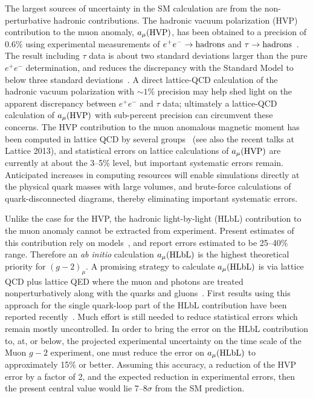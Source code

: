 \begin{itemize}
The largest sources of uncertainty in the SM calculation are from the non-perturbative hadronic contributions.
The hadronic vacuum polarization (HVP) contribution to the muon anomaly, $a_{\mu}(\rm HVP)$, has been obtained to a precision of 0.6\% using experimental measurements of $e^{+}e^{-}\to\rm hadrons$ and $\tau\to\rm hadrons$~\cite{Davier:2010nc,Hagiwara:2011af}.
The result including $\tau$ data is about two standard deviations larger than the pure $e^+e^-$
determination, and reduces the discrepancy with the Standard Model to below three standard
deviations~\cite{Davier:2010nc}.
A direct lattice-QCD calculation of the hadronic vacuum polarization with $\sim 1\%$ precision may help shed
light on the apparent discrepancy between $e^{+}e^{-}$ and $\tau$ data;
ultimately a lattice-QCD calculation of $a_{\mu}(\rm HVP)$ with sub-percent precision can circumvent these
concerns.  The HVP contribution to the muon anomalous magnetic moment has been computed in lattice QCD by several groups~\cite{Blum:2002ii,Gockeler:2003cw,Aubin:2006xv,Feng:2011zk,Boyle:2011hu,DellaMorte:2011aa} (see also the recent talks at Lattice 2013), and statistical errors on lattice calculations of $a_{\mu}(\rm HVP)$ are currently
at about the 3--5\% level, but important systematic errors remain. Anticipated increases in computing resources will enable simulations directly at the physical quark masses with large volumes, and brute-force calculations of quark-disconnected diagrams, thereby eliminating important systematic errors.

Unlike the case for the HVP, the hadronic light-by-light (HLbL) contribution to the muon anomaly cannot be extracted from experiment. Present estimates of this contribution rely on models~\cite{Prades:2009tw,Nyffeler:2009tw}, and report errors estimated to be 25--40\% range.
Therefore an \emph{ab initio} calculation $a_\mu({\rm HLbL})$ is the highest theoretical priority for $(g-2)_\mu$.
A promising strategy to calculate $a_\mu({\rm HLbL})$ is via lattice QCD plus lattice QED where
the muon and photons are treated nonperturbatively along with the quarks and
gluons~\cite{Hayakawa:2005eq}.
First results using this approach for the single quark-loop part of the HLbL contribution
have been reported recently~\cite{Blum:2013qu}.
Much effort is still needed to reduce statistical errors which remain mostly uncontrolled.
In order to bring the error on the HLbL contribution to, at, or below, the projected experimental uncertainty
on the time scale of the Muon $g-2$ experiment, one must reduce the error on $a_\mu({\rm HLbL})$ to
approximately 15\% or better.
Assuming this accuracy, a reduction of the HVP error by a factor of 2, and the expected reduction in
experimental errors, then the present central value would lie 7--8$\sigma$ from the SM prediction.


\end{itemize}
